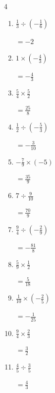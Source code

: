 \begin{multicols}{4}
\begin{enumerate}
        $\displaystyle =-\frac{1}{4}$

  \item $\displaystyle \frac{1}{3}\div{}\left(-\frac{1}{6}\right)$

        $\displaystyle =-2$

\columnbreak %

  \item $\displaystyle 1\times{}\left(-\frac{4}{3}\right)$

        $\displaystyle =-\frac{4}{3}$

  \item $\displaystyle \frac{5}{4}\times{}\frac{5}{2}$

        $\displaystyle =\frac{25}{8}$

  \item $\displaystyle \frac{1}{2}\div{}\left(-\frac{5}{3}\right)$

        $\displaystyle =-\frac{3}{10}$

  \item $\displaystyle -\frac{7}{9}\times{}\left(-5\right)$

        $\displaystyle =\frac{35}{9}$

  \item $\displaystyle 7\div{}\frac{9}{10}$

        $\displaystyle =\frac{70}{9}$

  \item $\displaystyle \frac{9}{4}\div{}\left(-\frac{2}{9}\right)$

        $\displaystyle =-\frac{81}{8}$

  \item $\displaystyle \frac{5}{9}\times{}\frac{1}{2}$

        $\displaystyle =\frac{5}{18}$

  \item $\displaystyle \frac{1}{10}\times{}\left(-\frac{2}{5}\right)$

        $\displaystyle =-\frac{1}{25}$

  \item $\displaystyle \frac{9}{4}\times{}\frac{2}{3}$

        $\displaystyle =\frac{3}{2}$

  \item $\displaystyle \frac{4}{5}\div{}\frac{3}{5}$

        $\displaystyle =\frac{4}{3}$

\columnbreak %


\end{enumerate}
\end{multicols}
